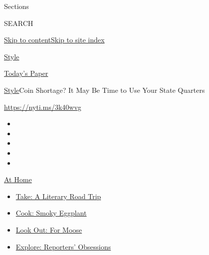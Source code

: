 Sections

SEARCH

\protect\hyperlink{site-content}{Skip to
content}\protect\hyperlink{site-index}{Skip to site index}

\href{https://www.nytimes3xbfgragh.onion/section/style}{Style}

\href{https://myaccount.nytimes3xbfgragh.onion/auth/login?response_type=cookie\&client_id=vi}{}

\href{https://www.nytimes3xbfgragh.onion/section/todayspaper}{Today's
Paper}

\href{/section/style}{Style}\textbar{}Coin Shortage? It May Be Time to
Use Your State Quarters

\href{https://nyti.ms/3k40wvg}{https://nyti.ms/3k40wvg}

\begin{itemize}
\item
\item
\item
\item
\item
\end{itemize}

\href{https://www.nytimes3xbfgragh.onion/spotlight/at-home?action=click\&pgtype=Article\&state=default\&region=TOP_BANNER\&context=at_home_menu}{At
Home}

\begin{itemize}
\tightlist
\item
  \href{https://www.nytimes3xbfgragh.onion/2020/07/28/books/time-for-a-literary-road-trip.html?action=click\&pgtype=Article\&state=default\&region=TOP_BANNER\&context=at_home_menu}{Take:
  A Literary Road Trip}
\item
  \href{https://www.nytimes3xbfgragh.onion/2020/07/29/magazine/bored-with-your-home-cooking-some-smoky-eggplant-will-fix-that.html?action=click\&pgtype=Article\&state=default\&region=TOP_BANNER\&context=at_home_menu}{Cook:
  Smoky Eggplant}
\item
  \href{https://www.nytimes3xbfgragh.onion/2020/07/27/travel/moose-michigan-isle-royale.html?action=click\&pgtype=Article\&state=default\&region=TOP_BANNER\&context=at_home_menu}{Look
  Out: For Moose}
\item
  \href{https://www.nytimes3xbfgragh.onion/interactive/2020/at-home/even-more-reporters-editors-diaries-lists-recommendations.html?action=click\&pgtype=Article\&state=default\&region=TOP_BANNER\&context=at_home_menu}{Explore:
  Reporters' Obsessions}
\end{itemize}

